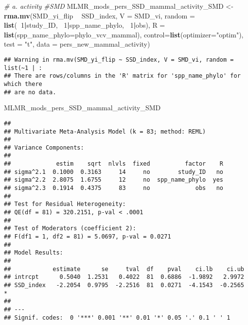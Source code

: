 \documentclass[]{article}
\newenvironment{Shaded}{\begin{snugshade}}{\end{snugshade}}
\newcommand{\KeywordTok}[1]{\textcolor[rgb]{0.13,0.29,0.53}{\textbf{#1}}}
\newcommand{\DataTypeTok}[1]{\textcolor[rgb]{0.13,0.29,0.53}{#1}}
\newcommand{\DecValTok}[1]{\textcolor[rgb]{0.00,0.00,0.81}{#1}}
\newcommand{\StringTok}[1]{\textcolor[rgb]{0.31,0.60,0.02}{#1}}
\newcommand{\CommentTok}[1]{\textcolor[rgb]{0.56,0.35,0.01}{\textit{#1}}}
\newcommand{\OperatorTok}[1]{\textcolor[rgb]{0.81,0.36,0.00}{\textbf{#1}}}
\newcommand{\NormalTok}[1]{#1}
\begin{document}
\begin{Shaded}
\begin{Highlighting}[]
    \CommentTok{# a. activity}
    \CommentTok{#SMD}
\NormalTok{    MLMR_mods_pers_SSD_mammal_activity_SMD <-}\StringTok{ }\KeywordTok{rma.mv}\NormalTok{(SMD_yi_flip }\OperatorTok{~}\StringTok{ }\NormalTok{SSD_index, }\DataTypeTok{V =}\NormalTok{ SMD_vi, }
                                          \DataTypeTok{random =} \KeywordTok{list}\NormalTok{(}\OperatorTok{~}\DecValTok{1}\OperatorTok{|}\NormalTok{study_ID, }\OperatorTok{~}\DecValTok{1}\OperatorTok{|}\NormalTok{spp_name_phylo, }\OperatorTok{~}\DecValTok{1}\OperatorTok{|}\NormalTok{obs), }
                                          \DataTypeTok{R =} \KeywordTok{list}\NormalTok{(}\DataTypeTok{spp_name_phylo=}\NormalTok{phylo_vcv_mammal), }\DataTypeTok{control=}\KeywordTok{list}\NormalTok{(}\DataTypeTok{optimizer=}\StringTok{"optim"}\NormalTok{), }
                                          \DataTypeTok{test =} \StringTok{"t"}\NormalTok{, }\DataTypeTok{data =}\NormalTok{ pers_new_mammal_activity)}
\end{Highlighting}
\end{Shaded}

\begin{verbatim}
## Warning in rma.mv(SMD_yi_flip ~ SSD_index, V = SMD_vi, random = list(~1 | :
## There are rows/columns in the 'R' matrix for 'spp_name_phylo' for which there
## are no data.
\end{verbatim}

\begin{Shaded}
\begin{Highlighting}[]
\NormalTok{    MLMR_mods_pers_SSD_mammal_activity_SMD}
\end{Highlighting}
\end{Shaded}

\begin{verbatim}
## 
## Multivariate Meta-Analysis Model (k = 83; method: REML)
## 
## Variance Components:
## 
##             estim    sqrt  nlvls  fixed          factor    R 
## sigma^2.1  0.1000  0.3163     14     no        study_ID   no 
## sigma^2.2  2.8075  1.6755     12     no  spp_name_phylo  yes 
## sigma^2.3  0.1914  0.4375     83     no             obs   no 
## 
## Test for Residual Heterogeneity:
## QE(df = 81) = 320.2151, p-val < .0001
## 
## Test of Moderators (coefficient 2):
## F(df1 = 1, df2 = 81) = 5.0697, p-val = 0.0271
## 
## Model Results:
## 
##            estimate      se     tval  df    pval    ci.lb    ci.ub 
## intrcpt      0.5040  1.2531   0.4022  81  0.6886  -1.9892   2.9972    
## SSD_index   -2.2054  0.9795  -2.2516  81  0.0271  -4.1543  -0.2565  * 
## 
## ---
## Signif. codes:  0 '***' 0.001 '**' 0.01 '*' 0.05 '.' 0.1 ' ' 1
\end{verbatim}
\end{document}
